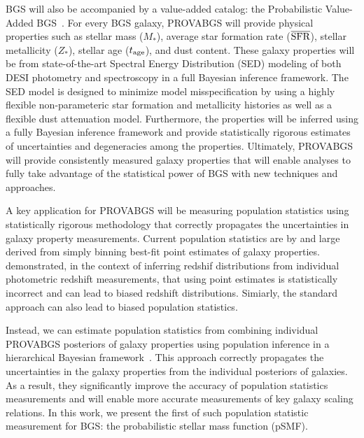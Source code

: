 BGS will also be accompanied by a value-added catalog: the Probabilistic
Value-Added BGS~\citep[PROVABGS;][]{hahn2022, kwon2022}.  
For every BGS galaxy, PROVABGS will provide physical properties such as stellar
mass ($M_*$), average star formation rate ($\overline{\rm SFR}$), stellar
metallicity ($Z_*$), stellar age ($t_{\rm age}$), and dust content. 
These galaxy properties will be from state-of-the-art Spectral Energy
Distribution (SED) modeling of both DESI photometry and spectroscopy in a full
Bayesian inference framework. 
The SED model is designed to minimize model misspecification by using a highly
flexible non-parameteric star formation and metallicity histories as well as a
flexible dust attenuation model.
Furthermore, the properties will be inferred using a fully Bayesian inference
framework and provide statistically rigorous estimates of uncertainties and
degeneracies among the properties.  
Ultimately, PROVABGS will provide consistently measured galaxy properties that
will enable analyses to fully take advantage of the statistical power of BGS
with new techniques and approaches. 

A key application for PROVABGS will be measuring population statistics using 
statistically rigorous methodology that correctly propagates the uncertainties
in galaxy property measurements. 
Current population statistics are by and large derived from simply binning
best-fit point estimates of galaxy properties. 
\cite{malz2020} demonstrated, in the context of inferring redshif distributions
from individual photometric redshift measurements, that using point estimates
is statistically incorrect and can lead to biased redshift distributions. 
Simiarly, the standard approach can also lead to biased population statistics. 

Instead, we can estimate population statistics from combining individual
PROVABGS posteriors of galaxy properties using population inference in a
hierarchical Bayesian framework~\citep[\emph{e.g.}][]{hogg2010,
foreman-mackey2014, baronchelli2020}.
This approach correctly propagates the uncertainties in the galaxy properties 
from the individual posteriors of galaxies. 
As a result, they significantly improve the accuracy of population statistics
measurements and will enable more accurate measurements of key galaxy scaling
relations. 
In this work, we present the first of such population statistic measurement for
BGS: the probabilistic stellar mass function (pSMF). 

